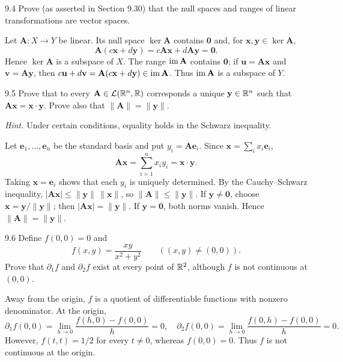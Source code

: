 \documentclass[11pt,oneside]{article}
\begin{document}
\begin{exercise}{9.4}
Prove (as asserted in Section 9.30) that the null spaces and ranges of linear transformations are vector spaces.
\end{exercise}
\begin{solution}
Let $\mathbf A\colon X\to Y$ be linear. Its null space $\ker\mathbf A$ contains $\mathbf 0$ and, for $\mathbf x,\mathbf y\in\ker\mathbf A$,
\[
 \mathbf A(c\mathbf x+d\mathbf y)=c\mathbf A\mathbf x+d\mathbf A\mathbf y=\mathbf 0.
\]
Hence $\ker\mathbf A$ is a subspace of $X$. The range $\operatorname{im}\mathbf A$ contains $\mathbf 0$; if $\mathbf u=\mathbf A\mathbf x$ and $\mathbf v=\mathbf A\mathbf y$, then $c\mathbf u+d\mathbf v=\mathbf A(c\mathbf x+d\mathbf y)\in\operatorname{im}\mathbf A$. Thus $\operatorname{im}\mathbf A$ is a subspace of $Y$.
\end{solution}

\begin{exercise}{9.5}
Prove that to every $\mathbf A\in\mathcal L(\mathbb{R}^n,\mathbb{R})$ corresponds a unique $\mathbf y\in\mathbb{R}^n$ such that $\mathbf A\mathbf x=\mathbf x\cdot\mathbf y$. Prove also that $\|\mathbf A\|=\|\mathbf y\|$.

\textit{Hint.} Under certain conditions, equality holds in the Schwarz inequality.
\end{exercise}
\begin{solution}
Let $\mathbf e_1,\ldots,\mathbf e_n$ be the standard basis and put $y_i=\mathbf A\mathbf e_i$. Since $\mathbf x=\sum_i x_i\mathbf e_i$,
\[
 \mathbf A\mathbf x=\sum_{i=1}^n x_i y_i=\mathbf x\cdot\mathbf y.
\]
Taking $\mathbf x=\mathbf e_i$ shows that each $y_i$ is uniquely determined. By the Cauchy--Schwarz inequality, $|\mathbf A\mathbf x|\le\|\mathbf y\|\,\|\mathbf x\|$, so $\|\mathbf A\|\le\|\mathbf y\|$. If $\mathbf y\ne\mathbf 0$, choose $\mathbf x=\mathbf y/\|\mathbf y\|$; then $|\mathbf A\mathbf x|=\|\mathbf y\|$. If $\mathbf y=\mathbf 0$, both norms vanish. Hence $\|\mathbf A\|=\|\mathbf y\|$.
\end{solution}

\begin{exercise}{9.6}
Define $f(0,0)=0$ and
\[
 f(x,y)=\frac{xy}{x^2+y^2}\qquad((x,y)\ne(0,0)).
\]
Prove that $\partial_1f$ and $\partial_2f$ exist at every point of $\mathbb{R}^2$, although $f$ is not continuous at $(0,0)$.
\end{exercise}
\begin{solution}
Away from the origin, $f$ is a quotient of differentiable functions with nonzero denominator. At the origin,
\[
 \partial_1f(0,0)=\lim_{h\to0}\frac{f(h,0)-f(0,0)}h=0,
 \quad
 \partial_2f(0,0)=\lim_{h\to0}\frac{f(0,h)-f(0,0)}h=0.
\]
However, $f(t,t)=1/2$ for every $t\ne0$, whereas $f(0,0)=0$. Thus $f$ is not continuous at the origin.
\end{solution}
\end{document}
